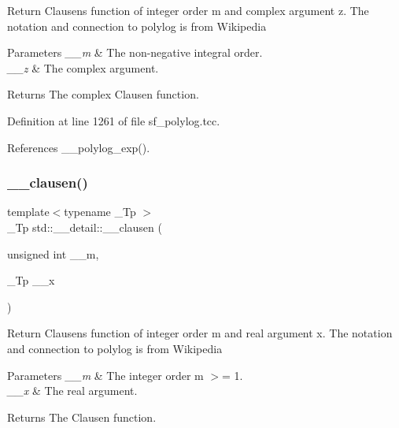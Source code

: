 Return Clausen\textquotesingle{}s function of integer order m and complex argument {\ttfamily z}. The notation and connection to polylog is from Wikipedia


\begin{DoxyParams}{Parameters}
{\em \+\_\+\+\_\+m} & The non-\/negative integral order. \\
\hline
{\em \+\_\+\+\_\+z} & The complex argument. \\
\hline
\end{DoxyParams}
\begin{DoxyReturn}{Returns}
The complex Clausen function. 
\end{DoxyReturn}


Definition at line 1261 of file sf\+\_\+polylog.\+tcc.



References \+\_\+\+\_\+polylog\+\_\+exp().

\mbox{\label{namespacestd_1_1____detail_a07d0f6b515fec03e423e5cecbb7580cd}} 
\subsubsection{\texorpdfstring{\+\_\+\+\_\+clausen()}{\_\_clausen()}\hspace{0.1cm}{\footnotesize\ttfamily [2/2]}}
{\footnotesize\ttfamily template$<$typename \+\_\+\+Tp $>$ \\
\+\_\+\+Tp std\+::\+\_\+\+\_\+detail\+::\+\_\+\+\_\+clausen (\begin{DoxyParamCaption}\item[{unsigned int}]{\+\_\+\+\_\+m,  }\item[{\+\_\+\+Tp}]{\+\_\+\+\_\+x }\end{DoxyParamCaption})}

Return Clausen\textquotesingle{}s function of integer order m and real argument x. The notation and connection to polylog is from Wikipedia


\begin{DoxyParams}{Parameters}
{\em \+\_\+\+\_\+m} & The integer order m $>$= 1. \\
\hline
{\em \+\_\+\+\_\+x} & The real argument. \\
\hline
\end{DoxyParams}
\begin{DoxyReturn}{Returns}
The Clausen function. 
\end{DoxyReturn}



